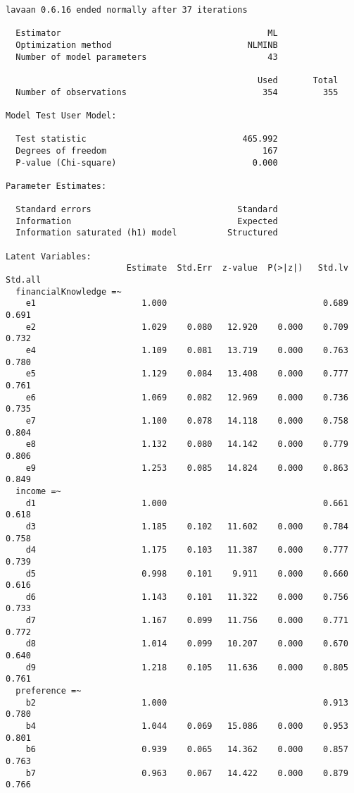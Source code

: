\documentclass[
  super,
  preprint,
  3p]{elsarticle}
\begin{document}
\begin{verbatim}
lavaan 0.6.16 ended normally after 37 iterations

  Estimator                                         ML
  Optimization method                           NLMINB
  Number of model parameters                        43

                                                  Used       Total
  Number of observations                           354         355

Model Test User Model:
                                                      
  Test statistic                               465.992
  Degrees of freedom                               167
  P-value (Chi-square)                           0.000

Parameter Estimates:

  Standard errors                             Standard
  Information                                 Expected
  Information saturated (h1) model          Structured

Latent Variables:
                        Estimate  Std.Err  z-value  P(>|z|)   Std.lv  Std.all
  financialKnowledge =~                                                      
    e1                     1.000                               0.689    0.691
    e2                     1.029    0.080   12.920    0.000    0.709    0.732
    e4                     1.109    0.081   13.719    0.000    0.763    0.780
    e5                     1.129    0.084   13.408    0.000    0.777    0.761
    e6                     1.069    0.082   12.969    0.000    0.736    0.735
    e7                     1.100    0.078   14.118    0.000    0.758    0.804
    e8                     1.132    0.080   14.142    0.000    0.779    0.806
    e9                     1.253    0.085   14.824    0.000    0.863    0.849
  income =~                                                                  
    d1                     1.000                               0.661    0.618
    d3                     1.185    0.102   11.602    0.000    0.784    0.758
    d4                     1.175    0.103   11.387    0.000    0.777    0.739
    d5                     0.998    0.101    9.911    0.000    0.660    0.616
    d6                     1.143    0.101   11.322    0.000    0.756    0.733
    d7                     1.167    0.099   11.756    0.000    0.771    0.772
    d8                     1.014    0.099   10.207    0.000    0.670    0.640
    d9                     1.218    0.105   11.636    0.000    0.805    0.761
  preference =~                                                              
    b2                     1.000                               0.913    0.780
    b4                     1.044    0.069   15.086    0.000    0.953    0.801
    b6                     0.939    0.065   14.362    0.000    0.857    0.763
    b7                     0.963    0.067   14.422    0.000    0.879    0.766


\end{verbatim}
\end{document}

